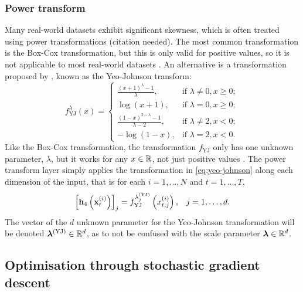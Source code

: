 \documentclass{statsmsc}
\begin{document}
{%

\subsubsection{Power transform}%
\label{ssub:Power transform}

Many real-world datasets exhibit significant skewness, which is often treated using power
transformations (citation needed). The most common transformation is the Box-Cox transformation,
but this is only valid for positive values, so it is not applicable to most real-world datasets
\citep{boxcox}. An alternative is a transformation proposed by \cite{yeoJohnson},
known as the Yeo-Johnson transform:
\begin{equation}\label{eq:yeo-johnson}
    f_{\textrm{YJ}}^\lambda(x)= \left\{
        \begin{array}{ll}
            \frac{(x+1)^{\lambda}-1}{\lambda}, & \textrm{if } \lambda \neq 0, x \geq 0; \\
            \log(x + 1), & \textrm{if } \lambda = 0, x \geq 0;  \\
            \frac{(1-x)^{2-\lambda}-1}{\lambda-2} , & \textrm{if } \lambda \neq 2, x < 0; \\
            -\log(1-x), & \textrm{if } \lambda=2, x < 0.
        \end{array}
    \right.
\end{equation}
Like the Box-Cox transformation, the transformation $f_{\textrm{YJ}}$ only has one unknown parameter, $\lambda$, but
it works for any $x \in \mathbb{R}$, not just positive values \citep{yeoJohnson}.
The power transform layer simply applies the transformation in \cref{eq:yeo-johnson} along each dimension of the input, that is for each $i=1,\dots,N$ and $t=1,\dots,T$,
\begin{equation}
    \left[\mathbf{h}_4\left(\mathbf{x}_t^{(i)}\right)\right]_j=f^{\lambda_j^{(\textrm{YJ})}}_{\textrm{YJ}}\left(x_{t,j}^{(i)}\right), \;\;\; j=1,\dots,d.
\end{equation}
The vector of the $d$ unknown parameter for the Yeo-Johnson transformation will be
denoted $\bm\lambda^{(\textrm{YJ})} \in \mathbb{R}^d$, as to not be confused with the scale parameter
$\bm\lambda \in \mathbb{R}^d$.



\subsection{Optimisation through stochastic gradient descent}%
\label{sub:edain_opt_sgd}

}
\end{document}
